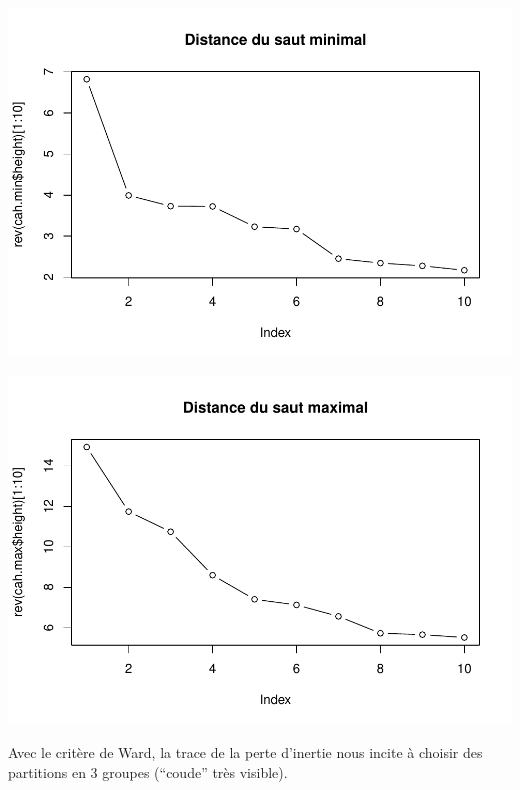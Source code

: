 \documentclass[
]{article}
\newenvironment{Shaded}{}{}
\newcommand{\AttributeTok}[1]{#1}
\newcommand{\DecValTok}[1]{#1}
\newcommand{\FunctionTok}[1]{#1}
\newcommand{\NormalTok}[1]{#1}
\newcommand{\SpecialCharTok}[1]{\textcolor[rgb]{0.00,0.50,0.50}{#1}}
\newcommand{\StringTok}[1]{\textcolor[rgb]{0.00,0.50,0.50}{#1}}
\begin{document}
\includegraphics{Projet_files/figure-latex/unnamed-chunk-16-1.pdf}

\begin{Shaded}
\end{Shaded}

\includegraphics{Projet_files/figure-latex/unnamed-chunk-17-1.pdf}

Avec le critère de Ward, la trace de la perte d'inertie nous incite à
choisir des partitions en 3 groupes (``coude'' très visible).
\end{document}
